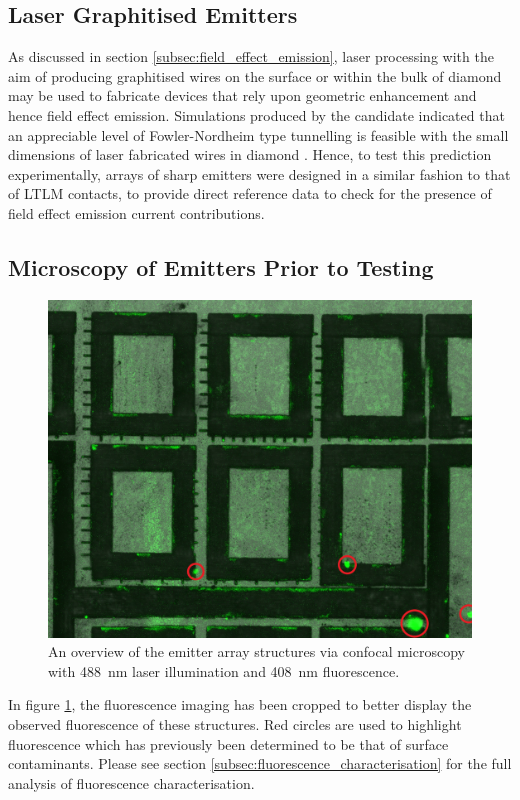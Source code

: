\begin{refsection}
\section{Laser Graphitised Emitters}
As discussed in section \ref{subsec:field_effect_emission}, laser processing with the aim of producing graphitised wires on the surface or within the bulk of diamond may be used to fabricate devices that rely upon geometric enhancement and hence field effect emission. Simulations produced by the candidate indicated that an appreciable level of Fowler-Nordheim type tunnelling is feasible with the small dimensions of laser fabricated wires in diamond \cite{sun2014}. Hence, to test this prediction experimentally, arrays of sharp emitters were designed in a similar fashion to that of LTLM contacts, to provide direct reference data to check for the presence of field effect emission current contributions.
\subsection{Microscopy of Emitters Prior to Testing}
\begin{figure}[H]
    \centering
    \includegraphics[width=\linewidth]{Chapter7/Figs/Raster/emitter_overview_fl.jpg}
    \caption{An overview of the emitter array structures via confocal microscopy with 488~\si{\nano\metre} laser illumination and 408~\si{\nano\metre} fluorescence.}
    \label{fig:emitter_fl}
\end{figure}

In figure \ref{fig:emitter_fl}, the fluorescence imaging has been cropped to better display the observed fluorescence of these structures. Red circles are used to highlight fluorescence which has previously been determined to be that of surface contaminants. Please see section \ref{subsec:fluorescence_characterisation} for the full analysis of fluorescence characterisation.


\end{refsection}
